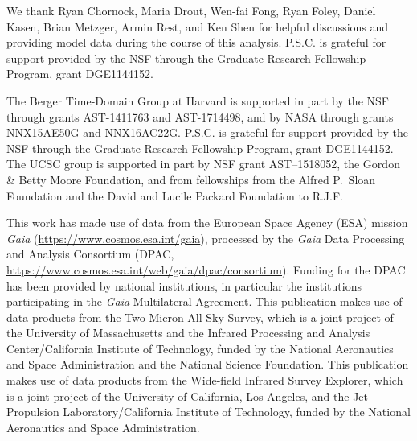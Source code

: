 We thank Ryan Chornock, Maria Drout, Wen-fai Fong, Ryan Foley, Daniel Kasen, Brian Metzger, Armin Rest, and Ken Shen for helpful discussions and providing model data during the course of this analysis. P.S.C. is grateful for support provided by the NSF through the Graduate Research Fellowship Program, grant DGE1144152.

The Berger Time-Domain Group at Harvard is supported in part by the NSF through grants AST-1411763 and AST-1714498, and by NASA through grants NNX15AE50G and NNX16AC22G. P.S.C. is grateful for support provided by the NSF
through the Graduate Research Fellowship Program, grant DGE1144152. The UCSC group is supported in part by NSF grant AST--1518052, the Gordon \& Betty Moore Foundation, and from fellowships from the Alfred P.\ Sloan Foundation and the David and Lucile Packard Foundation to R.J.F.

This work has made use of data from the European Space Agency (ESA)
mission {\it Gaia} (\url{https://www.cosmos.esa.int/gaia}), processed by
the {\it Gaia} Data Processing and Analysis Consortium (DPAC,
\url{https://www.cosmos.esa.int/web/gaia/dpac/consortium}). Funding
for the DPAC has been provided by national institutions, in particular
the institutions participating in the {\it Gaia} Multilateral Agreement.
This publication makes use of data products from the Two Micron All Sky Survey,
which is a joint project of the University of Massachusetts and the Infrared Processing
and Analysis Center/California Institute of Technology, funded by the National Aeronautics
and Space Administration and the National Science Foundation. This publication makes use
of data products from the Wide-field Infrared Survey Explorer, which is a joint project of the
University of California, Los Angeles, and the Jet Propulsion Laboratory/California Institute of
Technology, funded by the National Aeronautics and Space Administration.
